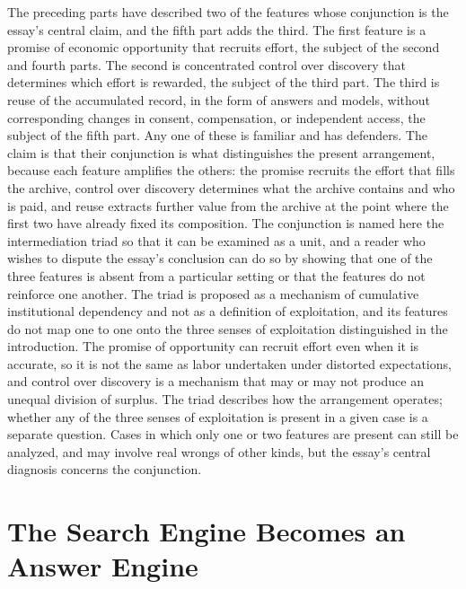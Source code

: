 \documentclass[11pt]{article}
\theoremstyle{remark}
\begin{document}
The preceding parts have described two of the features whose conjunction is the essay's central claim, and the fifth part adds the third. The first feature is a promise of economic opportunity that recruits effort, the subject of the second and fourth parts. The second is concentrated control over discovery that determines which effort is rewarded, the subject of the third part. The third is reuse of the accumulated record, in the form of answers and models, without corresponding changes in consent, compensation, or independent access, the subject of the fifth part. Any one of these is familiar and has defenders. The claim is that their conjunction is what distinguishes the present arrangement, because each feature amplifies the others: the promise recruits the effort that fills the archive, control over discovery determines what the archive contains and who is paid, and reuse extracts further value from the archive at the point where the first two have already fixed its composition. The conjunction is named here the intermediation triad so that it can be examined as a unit, and a reader who wishes to dispute the essay's conclusion can do so by showing that one of the three features is absent from a particular setting or that the features do not reinforce one another. The triad is proposed as a mechanism of cumulative institutional dependency and not as a definition of exploitation, and its features do not map one to one onto the three senses of exploitation distinguished in the introduction. The promise of opportunity can recruit effort even when it is accurate, so it is not the same as labor undertaken under distorted expectations, and control over discovery is a mechanism that may or may not produce an unequal division of surplus. The triad describes how the arrangement operates; whether any of the three senses of exploitation is present in a given case is a separate question. Cases in which only one or two features are present can still be analyzed, and may involve real wrongs of other kinds, but the essay's central diagnosis concerns the conjunction.

\section{The Search Engine Becomes an Answer Engine}
\end{document}
